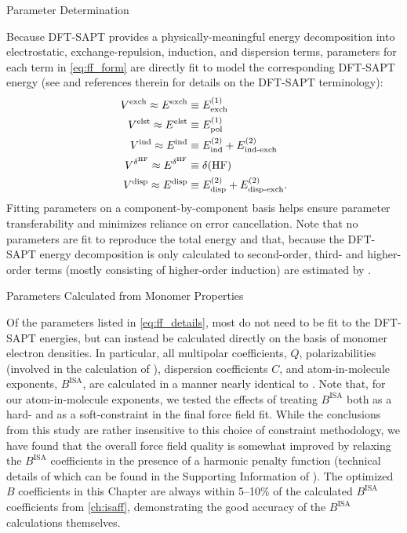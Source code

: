 \begin{subsection}{Parameter Determination}

Because DFT-SAPT provides a physically-meaningful energy decomposition into electrostatic,
exchange-repulsion, induction, and dispersion terms, parameters for each term in
\cref{eq:ff_form} are directly fit to model the corresponding DFT-SAPT energy
(see  and references therein for details on the DFT-SAPT
terminology): 
%
\begin{align}
\begin{split}
V^{\text{exch}} \approx E^{\text{exch}} &\equiv E^{(1)}_{\text{exch}} \\
V^{\text{elst}} \approx E^{\text{elst}} &\equiv E^{(1)}_{\text{pol}} \\
V^{\text{ind}} \approx E^{\text{ind}} &\equiv E^{(2)}_{\text{ind}} + E^{(2)}_{\text{ind-exch}} \\
V^{\delta^{\text{HF}}} \approx E^{\delta^{\text{HF}}} &\equiv \delta(\text{HF}) \\
V^{\text{disp}} \approx E^{\text{disp}} &\equiv E^{(2)}_{\text{disp}} + E^{(2)}_{\text{disp-exch}}.
\end{split}
\end{align}
%
Fitting parameters on a component-by-component basis helps ensure parameter
transferability and minimizes reliance on error cancellation. Note that no
parameters are fit to reproduce the total energy and that,
because the DFT-SAPT energy decomposition is only calculated to second-order, 
third- and higher-order terms (mostly consisting of higher-order induction)
are estimated by \edhf.

\begin{subsubsection}{Parameters Calculated from Monomer Properties}

Of the parameters listed in \cref{eq:ff_details}, most do not need to be
fit to the DFT-SAPT energies, but can instead be calculated directly on the
basis of monomer electron densities. In particular, all multipolar
coefficients, $Q$, polarizabilities (involved in the calculation of \vdrude),
dispersion coefficients $C$, and atom-in-molecule exponents, $B^{\text{ISA}}$, are calculated in a manner nearly
identical to . Note that, for our atom-in-molecule exponents, we tested
the effects of treating $B^{\text{ISA}}$ both as a hard- and as a
soft-constraint in the final force field fit. While the conclusions from this
study are rather insensitive to this choice of constraint methodology, we have
found that the overall force field quality is somewhat improved by
relaxing the $B^{\text{ISA}}$ coefficients in the presence of a harmonic
penalty function (technical details of which can be
found in the Supporting Information of ). The optimized $B$
coefficients in this Chapter are always within 5--10\% of the calculated $B^{\text{ISA}}$
coefficients from \cref{ch:isaff}, demonstrating the good accuracy of the $B^{\text{ISA}}$
calculations themselves.


\end{subsubsection}
\end{subsection}
